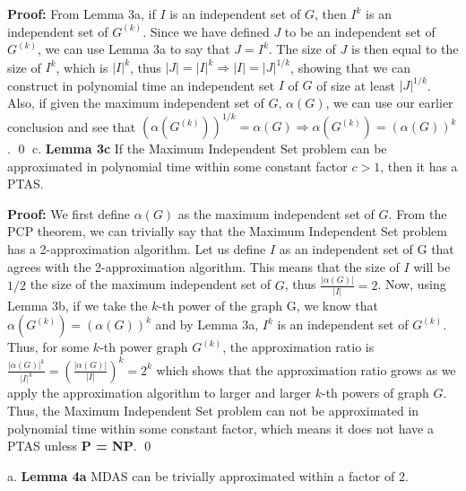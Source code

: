 \documentclass[oneside]{homework} %
\begin{document}
\textbf{Proof:} From Lemma 3a, if $I$ is an independent set of $G$, then $I^k$ is an independent set of $G^{(k)}$. Since we have defined $J$ to be an independent set of $G^{(k)}$, we can use Lemma 3a to say that $J = I^k$. The size of $J$ is then equal to the size of $I^k$, which is $|I|^k$, thus $|J| = |I|^k \Longrightarrow |I| = |J|^{1/k}$, showing that we can construct in polynomial time an independent set $I$ of $G$ of size at least $|J|^{1/k}$. Also, if given the maximum independent set of $G$, $\alpha(G)$, we can use our earlier conclusion and see that $(\alpha(G^{(k)}))^{1/k} = \alpha(G) \Longrightarrow \alpha(G^{(k)}) = (\alpha(G))^k$. \hfill\qed
\newline
\newline
{\large c.} \textbf{Lemma 3c} If the Maximum Independent Set problem can be approximated in polynomial time within some constant factor $c > 1$, then it has a PTAS.
\newline

\textbf{Proof:} We first define $\alpha(G)$ as the maximum independent set of $G$. From the PCP theorem, we can trivially say that the Maximum Independent Set problem has a 2-approximation algorithm. Let us define $I$ as an independent set of G that agrees with the 2-approximation algorithm. This means that the size of $I$ will be $1/2$ the size of the maximum independent set of $G$, thus $\frac{|\alpha(G)|}{|I|} = 2$. Now, using Lemma 3b, if we take the $k$-th power of the graph G, we know that $\alpha(G^{(k)}) = (\alpha(G))^k$ and by Lemma 3a, $I^k$ is an independent set of $G^{(k)}$. Thus, for some $k$-th power graph $G^{(k)}$, the approximation ratio is $\frac{|\alpha(G)|^k}{|I|^k} = (\frac{|\alpha(G)|}{|I|})^k = 2^k$ which shows that the approximation ratio grows as we apply the approximation algorithm to larger and larger $k$-th powers of graph $G$. Thus, the Maximum Independent Set problem can not be approximated in polynomial time within some constant factor, which means it does not have a PTAS unless \textbf{P = NP}. \hfill\qed

{\large a.} \textbf{Lemma 4a} MDAS can be trivially approximated within a factor of 2.
\newline
\end{document}
